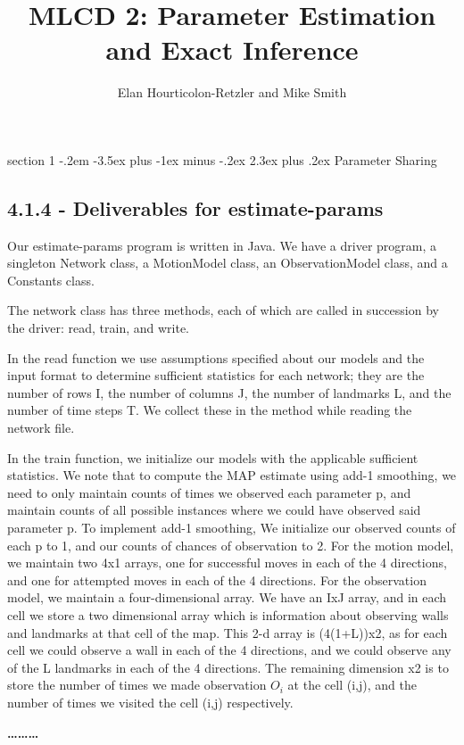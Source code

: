\documentclass[12pt]{article}
\makeatletter
\newenvironment{problem}{\@startsection
       {section}
       {1}
       {-.2em}
       {-3.5ex plus -1ex minus -.2ex}
       {2.3ex plus .2ex}
       {\pagebreak[3]%
       \large\bf\noindent{Problem }
       }
       }
       {%
       \begin{center}\large\bf \ldots\ldots\ldots\end{center}}
\makeatother
\begin{document}
\title{MLCD 2: Parameter Estimation and Exact Inference }
\author{Elan Hourticolon-Retzler and Mike Smith}

\maketitle

\thispagestyle{empty}

\begin{problem}{Parameter Sharing}


\subsection*{4.1.4 - Deliverables for estimate-params}

Our estimate-params program is written in Java.  We have a driver 
program, a singleton Network class, a MotionModel class, an 
ObservationModel class, and a Constants class.

The network class has three methods, each of which are called in 
succession by the driver: read, train, and write.

In the read function we use assumptions specified about our models and 
the input format to determine sufficient statistics for each network; 
they are the number of rows I, the number of columns J, the number of 
landmarks L, and the number of time steps T.  We collect these in the 
method while reading the network file.

In the train function, we initialize our models with the applicable 
sufficient statistics.  We note that to compute the MAP estimate using
add-1 smoothing, we need to only maintain counts of times we observed 
each parameter p, and maintain counts of all possible instances where 
we could have observed said parameter p.  To implement add-1 smoothing, 
We initialize our observed counts of each p to 1, and our counts of 
chances of observation to 2.
For the motion model, we maintain two 4x1 arrays, one for successful 
moves in each of the 4 directions, and one for attempted moves in each 
of the 4 directions.
For the observation model, we maintain a four-dimensional array.  We 
have an IxJ array, and in each cell we store a two dimensional array 
which is information about observing walls and landmarks at that cell 
of the map.  This 2-d array is (4(1+L))x2, as for each cell we could 
observe a wall in each of the 4 directions, and we could observe any of
 the L landmarks in each of the 4 directions.  The remaining dimension 
x2 is to store the number of times we made observation $O_i$ at the cell 
(i,j), and the number of times we visited the cell (i,j) respectively.


\end{problem}
\end{document}

